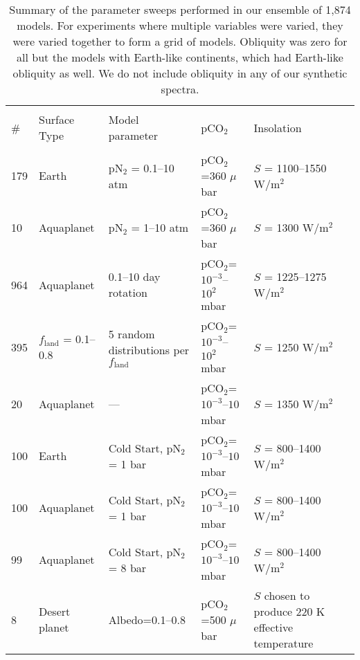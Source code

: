 \documentclass[fleqn,usenatbib]{mnras}
\begin{document}
\begin{table*}
\centering
\begin{tabular}{p{1cm} p{2.5cm} p{4cm} p{4cm} p{3.5cm}}
\hline\hline \\
\# & Surface Type & Model parameter & pCO$_2$ & Insolation \\
\hline\hline \\
179 & Earth & pN$_2$ = 0.1--10 atm & pCO$_2$=360 $\mu$bar & $S$ = 1100--1550 W/m$^2$ \\ \hline
10 & Aquaplanet & pN$_2$ = 1--10 atm & pCO$_2$=360 $\mu$bar & $S$ = 1300 W/m$^2$ \\ \hline
964 & Aquaplanet & 0.1--10 day rotation & pCO$_2$=$10^{-3}$--$10^2$ mbar & $S$ = 1225--1275 W/m$^2$\\ \hline
395 & $f_\text{land}$ = 0.1--0.8 & 5 random distributions per $f_\text{land}$ & pCO$_2$=$10^{-3}$--$10^2$ mbar & $S$ = 1250 W/m$^2$ \\ \hline
20 & Aquaplanet & --- & pCO$_2$=$10^{-3}$--$10$ mbar & $S$ = 1350 W/m$^2$ \\ \hline
100 & Earth & Cold Start, pN$_2$ = 1 bar  & pCO$_2$=$10^{-3}$--$10$ mbar & $S$ = 800--1400 W/m$^2$ \\ \hline
100 & Aquaplanet & Cold Start, pN$_2$ = 1 bar & pCO$_2$=$10^{-3}$--$10$ mbar & $S$ = 800--1400 W/m$^2$ \\ \hline
99 & Aquaplanet & Cold Start, pN$_2$ = 8 bar & pCO$_2$=$10^{-3}$--$10$ mbar & $S$ = 800--1400 W/m$^2$ \\ \hline
8 & Desert planet & Albedo=0.1--0.8 & pCO$_2$=500 $\mu$bar & $S$ chosen to produce 220 K effective temperature \\ \hline\hline
\end{tabular}
\caption{Summary of the parameter sweeps performed in our ensemble of 1,874 models. For experiments where multiple variables were varied, they were varied together to form a grid of models. Obliquity was zero for all but the models with Earth-like continents, which had Earth-like obliquity as well. We do not include obliquity in any of our synthetic spectra.}\label{obtable:models} 
\end{table*}
\end{document}

